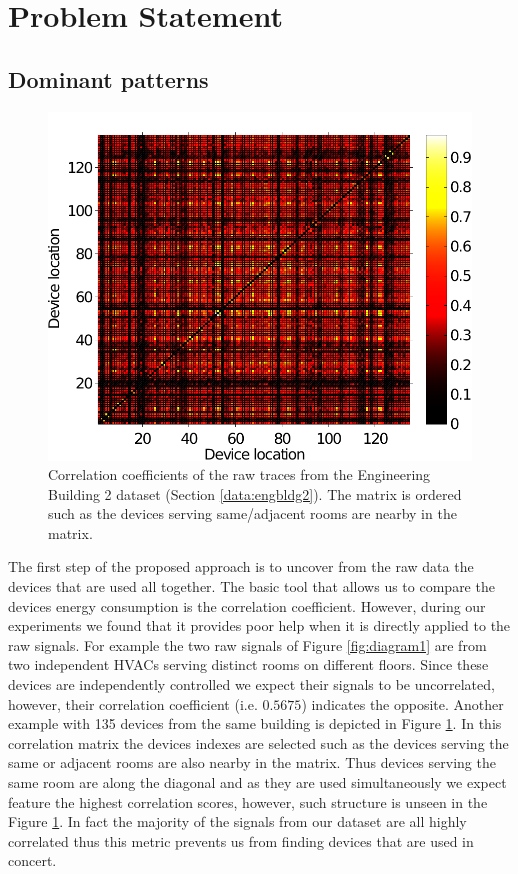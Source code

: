 \section{Problem Statement}
\subsection{Dominant patterns}
\begin{figure}
\begin{center}
\includegraphics[width=.45\textwidth]{img/heatMap_raw_201106-eps-converted-to.pdf}
\caption{Correlation coefficients of the raw traces from the Engineering Building 2 dataset (Section \ref{data:engbldg2}).
The matrix is ordered such as the devices serving same/adjacent rooms are nearby in the matrix.}
\label{fig:heatmap:raw}
\end{center}
\end{figure}

The first step of the proposed approach is to uncover from the raw data the devices that are used all together.
The basic tool that allows us to compare the devices energy consumption is the correlation coefficient.
However, during our experiments we found that it provides poor help when it is directly applied to the raw signals.
For example the two raw signals of Figure \ref{fig:diagram1} are from two independent HVACs serving distinct rooms on different floors.
Since these devices are independently controlled we expect their signals to be uncorrelated, however, their correlation coefficient (i.e. $0.5675$) indicates the opposite.
Another example with 135 devices from the same building is depicted in Figure \ref{fig:heatmap:raw}.
In this correlation matrix the devices indexes are selected such as the devices serving the same or adjacent rooms are also nearby in the matrix.
Thus devices serving the same room are along the diagonal and as they are used simultaneously we expect feature the highest correlation scores, however, such structure is unseen in the Figure \ref{fig:heatmap:raw}.
In fact the majority of the signals from our dataset are all highly correlated thus this metric prevents us from finding devices that are used in concert.

